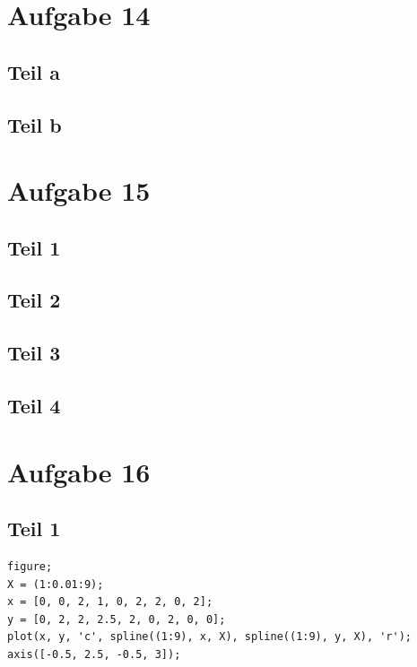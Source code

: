 \documentclass[10pt,a4paper]{article}
\begin{document}
\section{Aufgabe 14}

\subsection{Teil a}

\subsection{Teil b}

\section{Aufgabe 15}

\subsection{Teil 1}

\subsection{Teil 2}

\subsection{Teil 3}

\subsection{Teil 4}

\section{Aufgabe 16}

\subsection{Teil 1}

\begin{lstlisting}
figure;
X = (1:0.01:9);
x = [0, 0, 2, 1, 0, 2, 2, 0, 2];
y = [0, 2, 2, 2.5, 2, 0, 2, 0, 0];
plot(x, y, 'c', spline((1:9), x, X), spline((1:9), y, X), 'r');
axis([-0.5, 2.5, -0.5, 3]);
\end{lstlisting}
\end{document}
